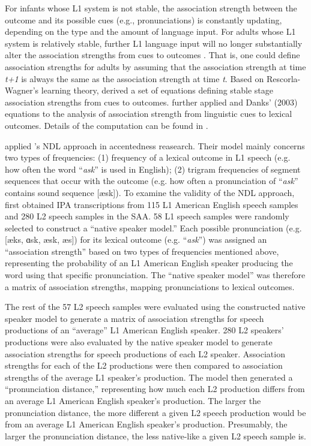 For infants whose L1 system is not stable, the association strength between the outcome and its possible cues (e.g., pronunciations) is constantly updating, depending on the type and the amount of language input. For adults whose L1 system is relatively stable, further L1 language input will no longer substantially alter the association strengths from cues to outcomes \citep{Chamorro_2016}. That is, one could define association strengths for adults by assuming that the association strength at time \textit{t+1} is always the same as the association strength at time \textit{t}. Based on Rescorla-Wagner’s learning theory, \citet{Danks_2003} derived a set of equations defining stable stage association strengths from cues to outcomes. \citet{Baayen_2011} further applied \citet{Rescorla_1972} and Danks’ (2003) equations to the analysis of association strength from linguistic cues to lexical outcomes. Details of the computation can be found in \citet{Baayen_2011}.

\citet{Wieling_2014} applied \citet{Baayen_2011}’s NDL approach in accentedness reasearch. Their model mainly concerns two types of frequencies: (1) frequency of a lexical outcome in L1 speech (e.g. how often the word “\textit{ask}” is used in English); (2) trigram frequencies of segment sequences that occur with the outcome (e.g. how often a pronunciation of “\textit{ask}” contains sound sequence [æsk]). To examine the validity of the NDL approach, \citet{Wieling_2014} first obtained IPA transcriptions from 115 L1 American English speech samples and 280 L2 speech samples in the SAA. 58 L1 speech samples were randomly selected to construct a “native speaker model.” Each possible pronunciation (e.g. [æks, ɑsk, æsk, æs]) for its lexical outcome (e.g. “\textit{ask}”) was assigned an “association strength” based on two types of frequencies mentioned above, representing the probability of an L1 American English speaker producing the word using that specific pronunciation. The “native speaker model” was therefore a matrix of association strengths, mapping pronunciations to lexical outcomes.

The rest of the 57 L2 speech samples were evaluated using the constructed native speaker model to generate a matrix of association strengths for speech productions of an “average” L1 American English speaker. 280 L2 speakers' productions were also evaluated by the native speaker model to generate association strengths for speech productions of each L2 speaker. Association strengths for each of the L2 productions were then compared to association strengths of the average L1 speaker's production. The model then generated a “pronunciation distance,” representing how much each L2 production differs from an average L1 American English speaker's production. The larger the pronunciation distance, the more different a given L2 speech production would be from an average L1 American English speaker's production. Presumably, the larger the pronunciation distance, the less native-like a given L2 speech sample is. 

